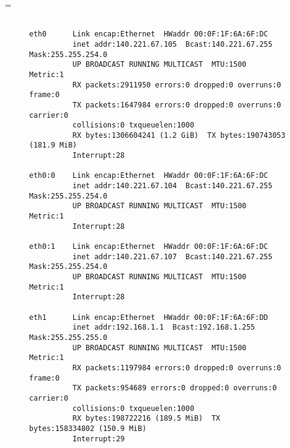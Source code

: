 \documentclass[11pt]{article}
\makeatletter
\let\realnormalsize=\normalsize
\def\preveqno{}\let\real@float=\@float \let\realend@float=\end@float
\def\@float{\let\@savefreelist\@freelist\real@float}
\def\liih@math{\ifmmode$\else\bad@math\fi}
\def\end@float{\realend@float\global\let\@freelist\@savefreelist}
\def\adjustnormalsize{\def\normalsize{\mathsurround=0pt \realnormalsize
 \parindent=0pt\abovedisplayskip=0pt\belowdisplayskip=0pt}%
 \def\phantompar{\csname par\endcsname}\normalsize}%
\def\lthtmltypeout#1{{\let\protect\string \immediate\write\lthtmlwrite{#1}}}%
\newcommand\lthtmlvboxmathA{\adjustnormalsize\setbox\sizebox=\vbox\bgroup %
 \let\ifinner=\iffalse \let\)\liih@math }%
\newcommand\lthtmlboxmathZ{\@next\next\@currlist{}{\def\next{\voidb@x}}%
 \expandafter\box\next\egroup}%
\newcommand\lthtmlmathtype[1]{\gdef\lthtmlmathenv{#1}}%
\newcommand\lthtmllogmath{\lthtmltypeout{l2hSize %
:\lthtmlmathenv:\the\ht\sizebox::\the\dp\sizebox::\the\wd\sizebox.\preveqno}}%
\newcommand\lthtmlfigureA[1]{\let\@savefreelist\@freelist
       \lthtmlmathtype{#1}\lthtmlvboxmathA}%
\newcommand\lthtmlfigureZ{\lthtmlboxmathZ\lthtmllogmath\copy\sizebox
       \global\let\@freelist\@savefreelist}%
\def\lthtmlcheckvsize{\ifdim\ht\sizebox<\vsize 
  \ifdim\wd\sizebox<\hsize\expandafter\hfill\fi \expandafter\vfill
  \else\expandafter\vss\fi}%
\makeatother
\begin{document}
{\newpage\clearpage
\lthtmlfigureA{figure125}%
\begin{figure}\begin{scriptsize}
\begin{verbatim}

eth0      Link encap:Ethernet  HWaddr 00:0F:1F:6A:6F:DC  
          inet addr:140.221.67.105  Bcast:140.221.67.255  Mask:255.255.254.0
          UP BROADCAST RUNNING MULTICAST  MTU:1500  Metric:1
          RX packets:2911950 errors:0 dropped:0 overruns:0 frame:0
          TX packets:1647984 errors:0 dropped:0 overruns:0 carrier:0
          collisions:0 txqueuelen:1000 
          RX bytes:1306604241 (1.2 GiB)  TX bytes:190743053 (181.9 MiB)
          Interrupt:28 

eth0:0    Link encap:Ethernet  HWaddr 00:0F:1F:6A:6F:DC  
          inet addr:140.221.67.104  Bcast:140.221.67.255  Mask:255.255.254.0
          UP BROADCAST RUNNING MULTICAST  MTU:1500  Metric:1
          Interrupt:28 

eth0:1    Link encap:Ethernet  HWaddr 00:0F:1F:6A:6F:DC  
          inet addr:140.221.67.107  Bcast:140.221.67.255  Mask:255.255.254.0
          UP BROADCAST RUNNING MULTICAST  MTU:1500  Metric:1
          Interrupt:28 

eth1      Link encap:Ethernet  HWaddr 00:0F:1F:6A:6F:DD  
          inet addr:192.168.1.1  Bcast:192.168.1.255  Mask:255.255.255.0
          UP BROADCAST RUNNING MULTICAST  MTU:1500  Metric:1
          RX packets:1197984 errors:0 dropped:0 overruns:0 frame:0
          TX packets:954689 errors:0 dropped:0 overruns:0 carrier:0
          collisions:0 txqueuelen:1000 
          RX bytes:198722216 (189.5 MiB)  TX bytes:158334802 (150.9 MiB)
          Interrupt:29\end{verbatim}
\end{scriptsize}
\end{figure}%
\lthtmlfigureZ
\lthtmlcheckvsize\clearpage}

\end{document}
